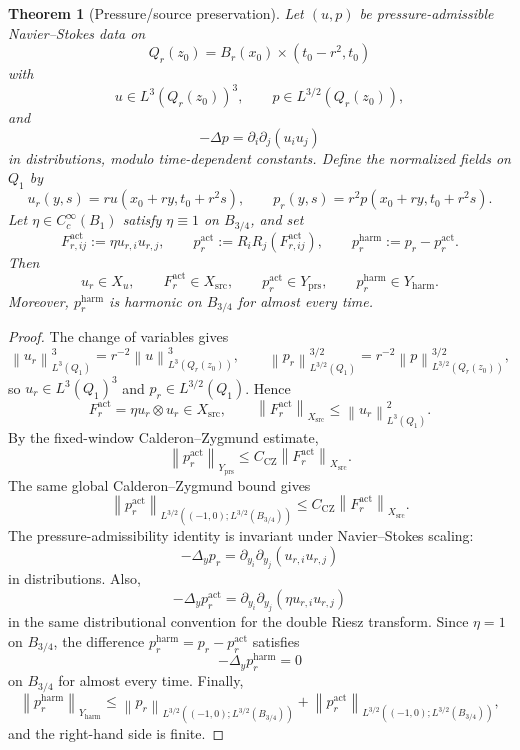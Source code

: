\documentclass[11pt]{article}
\numberwithin{equation}{section}
\theoremstyle{plain}
\newtheorem{theorem}{Theorem}[section]
\theoremstyle{definition}
\theoremstyle{remark}
\newcommand{\prs}{\mathrm{prs}}
\newcommand{\harm}{\mathrm{harm}}
\newcommand{\norm}[1]{\left\lVert #1\right\rVert}
\begin{document}
\begin{theorem}[Pressure/source preservation]\label{thm:ns-pressure-source-preservation}
Let \((u,p)\) be pressure-admissible Navier--Stokes data on
\[
  Q_r(z_0)=B_r(x_0)\times(t_0-r^2,t_0)
\]
with
\[
  u\in L^3(Q_r(z_0))^3,\qquad p\in L^{3/2}(Q_r(z_0)),
\]
and
\[
  -\Delta p=\partial_i\partial_j(u_i u_j)
\]
in distributions, modulo time-dependent constants.  Define the normalized
fields on \(Q_1\) by
\[
  u_r(y,s)=r u(x_0+ry,t_0+r^2s),\qquad
  p_r(y,s)=r^2 p(x_0+ry,t_0+r^2s).
\]
Let \(\eta\in C_c^\infty(B_1)\) satisfy \(\eta\equiv1\) on \(B_{3/4}\), and
set
\[
  F_{r,ij}^{\mathrm{act}}:=\eta u_{r,i}u_{r,j},
  \qquad
  p_r^{\mathrm{act}}:=R_iR_j(F_{r,ij}^{\mathrm{act}}),
  \qquad
  p_r^{\harm}:=p_r-p_r^{\mathrm{act}}.
\]
Then
\[
  u_r\in X_u,\qquad
  F_r^{\mathrm{act}}\in X_{\mathrm{src}},\qquad
  p_r^{\mathrm{act}}\in Y_{\prs},\qquad
  p_r^{\harm}\in Y_{\harm}.
\]
Moreover, \(p_r^{\harm}\) is harmonic on \(B_{3/4}\) for almost every time.
\end{theorem}

\begin{proof}
The change of variables gives
\[
  \norm{u_r}_{L^3(Q_1)}^3
  =
  r^{-2}\norm{u}_{L^3(Q_r(z_0))}^3,
  \qquad
  \norm{p_r}_{L^{3/2}(Q_1)}^{3/2}
  =
  r^{-2}\norm{p}_{L^{3/2}(Q_r(z_0))}^{3/2},
\]
so \(u_r\in L^3(Q_1)^3\) and \(p_r\in L^{3/2}(Q_1)\).  Hence
\[
  F_r^{\mathrm{act}}=\eta u_r\otimes u_r\in X_{\mathrm{src}},
  \qquad
  \norm{F_r^{\mathrm{act}}}_{X_{\mathrm{src}}}
  \le
  \norm{u_r}_{L^3(Q_1)}^2.
\]
By the fixed-window Calderon--Zygmund estimate,
\[
  \norm{p_r^{\mathrm{act}}}_{Y_{\prs}}
  \le
  C_{\mathrm{CZ}}\norm{F_r^{\mathrm{act}}}_{X_{\mathrm{src}}}.
\]
The same global Calderon--Zygmund bound gives
\[
  \norm{p_r^{\mathrm{act}}}_{L^{3/2}((-1,0);L^{3/2}(B_{3/4}))}
  \le
  C_{\mathrm{CZ}}\norm{F_r^{\mathrm{act}}}_{X_{\mathrm{src}}}.
\]
The pressure-admissibility identity is invariant under Navier--Stokes
scaling:
\[
  -\Delta_y p_r
  =
  \partial_{y_i}\partial_{y_j}(u_{r,i}u_{r,j})
\]
in distributions.  Also,
\[
  -\Delta_y p_r^{\mathrm{act}}
  =
  \partial_{y_i}\partial_{y_j}(\eta u_{r,i}u_{r,j})
\]
in the same distributional convention for the double Riesz transform.  Since
\(\eta=1\) on \(B_{3/4}\), the difference \(p_r^{\harm}=p_r-p_r^{\mathrm{act}}\)
satisfies
\[
  -\Delta_y p_r^{\harm}=0
\]
on \(B_{3/4}\) for almost every time.  Finally,
\[
  \norm{p_r^{\harm}}_{Y_{\harm}}
  \le
  \norm{p_r}_{L^{3/2}((-1,0);L^{3/2}(B_{3/4}))}
  +
  \norm{p_r^{\mathrm{act}}}_{L^{3/2}((-1,0);L^{3/2}(B_{3/4}))},
\]
and the right-hand side is finite.
\end{proof}
\end{document}
